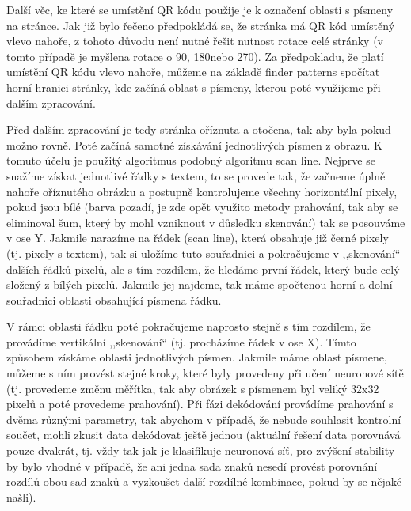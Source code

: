 \documentclass[conference]{IEEEtran}
\begin{document}
Další věc, ke které se umístění QR kódu použije je k označení oblasti s písmeny na stránce. Jak již bylo řečeno předpokládá se, že stránka má QR kód umístěný vlevo nahoře, z tohoto důvodu není nutné řešit nutnost rotace celé stránky (v tomto případě je myšlena rotace o 90\degree, 180\degree nebo 270\degree). Za předpokladu, že platí umístění QR kódu vlevo nahoře, můžeme na základě finder patterns spočítat horní hranici stránky, kde začíná oblast s písmeny, kterou poté využijeme při dalším zpracování.

Před dalším zpracování je tedy stránka oříznuta a otočena, tak aby byla pokud možno rovně. Poté začíná samotné získávání jednotlivých písmen z obrazu. K tomuto účelu je použitý algoritmus podobný algoritmu scan line. Nejprve se snažíme získat jednotlivé řádky s textem, to se provede tak, že začneme úplně nahoře oříznutého obrázku a postupně kontrolujeme všechny horizontální pixely, pokud jsou bílé (barva pozadí, je zde opět využito metody prahování, tak aby se eliminoval šum, který by mohl vzniknout v důsledku skenování) tak se posouváme v ose Y. Jakmile narazíme na řádek (scan line), která obsahuje již černé pixely (tj. pixely s textem), tak si uložíme tuto souřadnici a pokračujeme v ,,skenování`` dalších řádků pixelů, ale s tím rozdílem, že hledáme první řádek, který bude celý složený z bílých pixelů. Jakmile jej najdeme, tak máme spočtenou horní a dolní souřadnici oblasti obsahující písmena řádku.

V rámci oblasti řádku poté pokračujeme naprosto stejně s tím rozdílem, že provádíme vertikální ,,skenování`` (tj. procházíme řádek v ose X). Tímto způsobem získáme oblasti jednotlivých písmen. Jakmile máme oblast písmene, můžeme s ním provést stejné kroky, které byly provedeny při učení neuronové sítě (tj. provedeme změnu měřítka, tak aby obrázek s písmenem byl veliký 32x32 pixelů a poté provedeme prahování). Při fázi dekódování provádíme prahování s dvěma různými parametry, tak abychom v případě, že nebude souhlasit kontrolní součet, mohli zkusit data dekódovat ještě jednou (aktuální řešení data porovnává pouze dvakrát, tj. vždy tak jak je klasifikuje neuronová síť, pro zvýšení stability by bylo vhodné v případě, že ani jedna sada znaků nesedí provést porovnání rozdílů obou sad znaků a vyzkoušet další rozdílné kombinace, pokud by se nějaké našli). 
\end{document}
